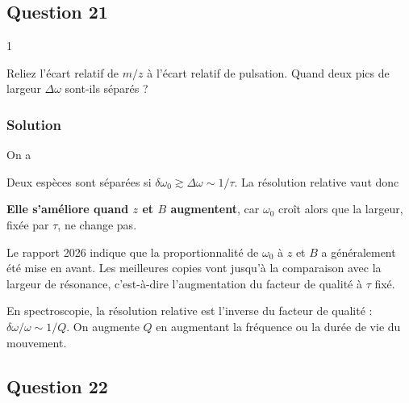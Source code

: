 \documentclass[11pt,a4paper]{article}
\newcommand{\equationajustee}[1]{%
  \sbox{\boiteequation}{$\displaystyle #1$}%
  \ifdim\wd\boiteequation>\linewidth
    \[\resizebox{\linewidth}{!}{\usebox{\boiteequation}}\]%
  \else
    \[#1\]%
  \fi}
\begin{document}
\hypertarget{question-21}{%
\subsection{Question 21}\label{question-21}}

\begin{indication}{1}

Reliez l'écart relatif de \(m/z\) à l'écart relatif de pulsation. Quand deux pics de largeur \(\Delta\omega\) sont-ils séparés ?

\end{indication}

\hypertarget{solution-20}{%
\subsubsection{Solution}\label{solution-20}}

On a

\equationajustee{\frac{\delta(m/z)}{m/z}=\frac{\delta\omega_0}{\omega_0}.}

Deux espèces sont séparées si \(\delta\omega_0\gtrsim\Delta\omega\sim1/\tau\). La résolution relative vaut donc

\equationajustee{\frac{\delta m}{m}\sim\frac{1}{\omega_0\tau}=\frac{m}{zeB\tau}.}

\textbf{Elle s'améliore quand \(z\) et \(B\) augmentent}, car \(\omega_0\) croît alors que la largeur, fixée par \(\tau\), ne change pas.

\begin{jury}

Le rapport 2026 indique que la proportionnalité de \(\omega_0\) à \(z\) et \(B\) a généralement été mise en avant. Les meilleures copies vont jusqu'à la comparaison avec la largeur de résonance, c'est-à-dire l'augmentation du facteur de qualité à \(\tau\) fixé.

\end{jury}

\begin{methode}

En spectroscopie, la résolution relative est l'inverse du facteur de qualité : \(\delta\omega/\omega\sim1/Q\). On augmente \(Q\) en augmentant la fréquence ou la durée de vie du mouvement.

\end{methode}

\hypertarget{question-22}{%
\subsection{Question 22}\label{question-22}}
\end{document}
